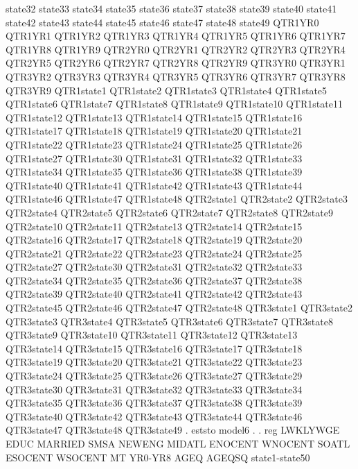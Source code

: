                state32 state33 state34 state35 state36 state37 state38
               state39 state40 state41 state42 state43 state44 state45
               state46 state47 state48 state49 QTR1YR0 QTR1YR1 QTR1YR2
               QTR1YR3 QTR1YR4 QTR1YR5 QTR1YR6 QTR1YR7 QTR1YR8 QTR1YR9
               QTR2YR0 QTR2YR1 QTR2YR2 QTR2YR3 QTR2YR4 QTR2YR5 QTR2YR6
               QTR2YR7 QTR2YR8 QTR2YR9 QTR3YR0 QTR3YR1 QTR3YR2 QTR3YR3
               QTR3YR4 QTR3YR5 QTR3YR6 QTR3YR7 QTR3YR8 QTR3YR9 QTR1state1
               QTR1state2 QTR1state3 QTR1state4 QTR1state5 QTR1state6
               QTR1state7 QTR1state8 QTR1state9 QTR1state10 QTR1state11
               QTR1state12 QTR1state13 QTR1state14 QTR1state15 QTR1state16
               QTR1state17 QTR1state18 QTR1state19 QTR1state20 QTR1state21
               QTR1state22 QTR1state23 QTR1state24 QTR1state25 QTR1state26
               QTR1state27 QTR1state30 QTR1state31 QTR1state32 QTR1state33
               QTR1state34 QTR1state35 QTR1state36 QTR1state38 QTR1state39
               QTR1state40 QTR1state41 QTR1state42 QTR1state43 QTR1state44
               QTR1state46 QTR1state47 QTR1state48 QTR2state1 QTR2state2
               QTR2state3 QTR2state4 QTR2state5 QTR2state6 QTR2state7
               QTR2state8 QTR2state9 QTR2state10 QTR2state11 QTR2state13
               QTR2state14 QTR2state15 QTR2state16 QTR2state17 QTR2state18
               QTR2state19 QTR2state20 QTR2state21 QTR2state22 QTR2state23
               QTR2state24 QTR2state25 QTR2state27 QTR2state30 QTR2state31
               QTR2state32 QTR2state33 QTR2state34 QTR2state35 QTR2state36
               QTR2state37 QTR2state38 QTR2state39 QTR2state40 QTR2state41
               QTR2state42 QTR2state43 QTR2state45 QTR2state46 QTR2state47
               QTR2state48 QTR3state1 QTR3state2 QTR3state3 QTR3state4
               QTR3state5 QTR3state6 QTR3state7 QTR3state8 QTR3state9
               QTR3state10 QTR3state11 QTR3state12 QTR3state13 QTR3state14
               QTR3state15 QTR3state16 QTR3state17 QTR3state18 QTR3state19
               QTR3state20 QTR3state21 QTR3state22 QTR3state23 QTR3state24
               QTR3state25 QTR3state26 QTR3state27 QTR3state29 QTR3state30
               QTR3state31 QTR3state32 QTR3state33 QTR3state34 QTR3state35
               QTR3state36 QTR3state37 QTR3state38 QTR3state39 QTR3state40
               QTR3state42 QTR3state43 QTR3state44 QTR3state46 QTR3state47
               QTR3state48 QTR3state49
{\smallskip}
. eststo model6
{\smallskip}
. 
. reg  LWKLYWGE EDUC MARRIED SMSA NEWENG MIDATL ENOCENT WNOCENT SOATL ESOCENT WSOCENT MT YR0-YR8 AGEQ AGEQSQ state1-state50
